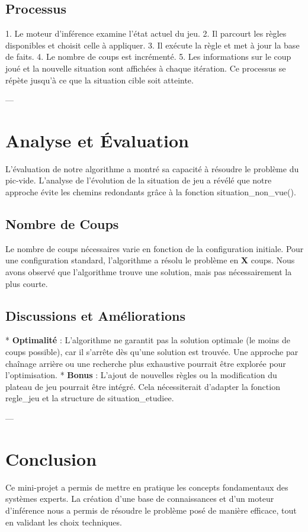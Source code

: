 \documentclass[12pt, a4paper]{article}
\begin{document}
\subsection{Processus}
1.  Le moteur d'inférence examine l'état actuel du jeu.
2.  Il parcourt les règles disponibles et choisit celle à appliquer.
3.  Il exécute la règle et met à jour la base de faits.
4.  Le nombre de coups est incrémenté.
5.  Les informations sur le coup joué et la nouvelle situation sont affichées à chaque itération. Ce processus se répète jusqu'à ce que la situation cible soit atteinte.

---
\section{Analyse et Évaluation}
L'évaluation de notre algorithme a montré sa capacité à résoudre le problème du pic-vide.  L'analyse de l'évolution de la situation de jeu a révélé que notre approche évite les chemins redondants grâce à la fonction situation\_non\_vue().

\subsection{Nombre de Coups}
Le nombre de coups nécessaires varie en fonction de la configuration initiale. Pour une configuration standard, l'algorithme a résolu le problème en \textbf{X} coups. Nous avons observé que l'algorithme trouve une solution, mais pas nécessairement la plus courte.

\subsection{Discussions et Améliorations}
* \textbf{Optimalité} : L'algorithme ne garantit pas la solution optimale (le moins de coups possible), car il s'arrête dès qu'une solution est trouvée. Une approche par chaînage arrière ou une recherche plus exhaustive pourrait être explorée pour l'optimisation.
* \textbf{Bonus} : L'ajout de nouvelles règles ou la modification du plateau de jeu pourrait être intégré. Cela nécessiterait d'adapter la fonction regle\_jeu et la structure de situation\_etudiee.

---
\section{Conclusion}
Ce mini-projet a permis de mettre en pratique les concepts fondamentaux des systèmes experts. La création d'une base de connaissances et d'un moteur d'inférence nous a permis de résoudre le problème posé de manière efficace, tout en validant les choix techniques.
\end{document}
